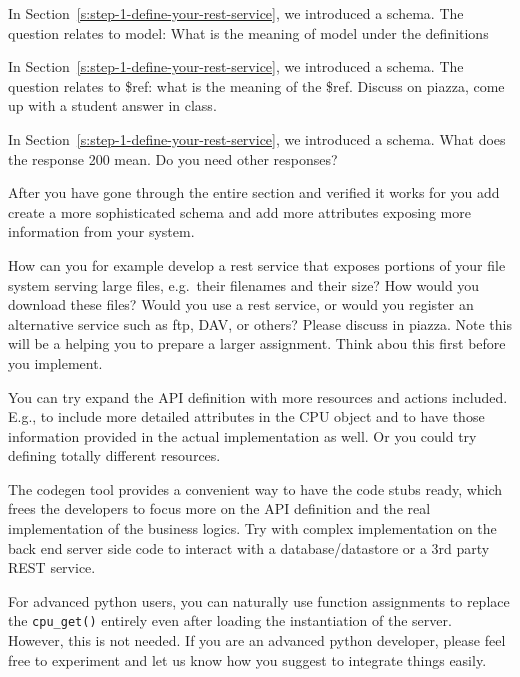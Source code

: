\begin{exercise}
  In Section~\ref{s:step-1-define-your-rest-service}, we introduced a
  schema. The question relates to model: What is the meaning of model
  under the definitions
\end{exercise}

\begin{exercise}
  In Section~\ref{s:step-1-define-your-rest-service}, we introduced a
  schema. The question relates to \$ref: what is the meaning of the
  \$ref. Discuss on piazza, come up with a student answer in class.
\end{exercise}

\begin{exercise}
  In Section~\ref{s:step-1-define-your-rest-service}, we introduced a
  schema.  What does the response 200 mean. Do you need other
  responses?
\end{exercise}

\begin{exercise}
  After you have gone through the entire section and verified it works
  for you add create a more sophisticated schema and add more attributes
  exposing more information from your system.
\end{exercise}

\begin{exercise}
  How can you for example develop a rest service that exposes portions
  of your file system serving large files, e.g.~their filenames and
  their size? How would you download these files? Would you use a rest
  service, or would you register an alternative service such as ftp,
  DAV, or others? Please discuss in piazza. Note this will be a helping
  you to prepare a larger assignment. Think abou this first before you
  implement.
\end{exercise}


\begin{exercise}
You can try expand the API definition with more resources and
actions included. E.g., to include more detailed attributes in the CPU
object and to have those information provided in the actual
implementation as well. Or you could try defining totally different
resources.
\end{exercise}

\begin{exercise}
The codegen tool provides a convenient way to have the code
stubs ready, which frees the developers to focus more on the API
definition and the real implementation of the business logics. Try with
complex implementation on the back end server side code to interact with
a database/datastore or a 3rd party REST service.
\end{exercise}

\begin{exercise}
For advanced python users, you can naturally use function assignments to
replace the \texttt{cpu\_get()} entirely even after loading the
instantiation of the server. However, this is not needed. If you are an
advanced python developer, please feel free to experiment and let us
know how you suggest to integrate things easily.
\end{exercise}